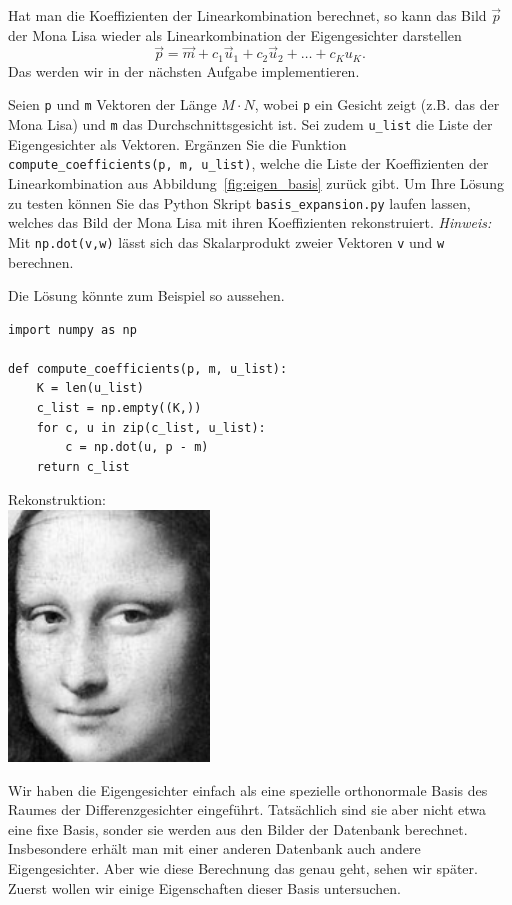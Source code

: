 Hat man die Koeffizienten der Linearkombination berechnet, so kann das Bild $\vec p$ der Mona Lisa wieder als Linearkombination der Eigengesichter darstellen
\begin{equation*}
	\vec p=\vec m+c_1\vec u_1+c_2\vec u_2+\ldots+c_Ku_K.
\end{equation*}
Das werden wir in der nächsten Aufgabe implementieren.
\begin{aufgabe} \label{aufg:compute_coefficients}
	Seien \texttt{p} und \texttt{m} Vektoren der Länge $M\cdot N$, wobei \texttt{p} ein Gesicht zeigt (z.B. das der Mona Lisa) und \texttt{m} das Durchschnittsgesicht ist.
	Sei zudem \texttt{u\_list} die Liste der Eigengesichter als Vektoren.
	Ergänzen Sie die Funktion \texttt{compute\_coefficients(p, m, u\_list)}, welche die Liste der Koeffizienten der Linearkombination aus Abbildung~\ref{fig:eigen_basis} zurück gibt.
	Um Ihre Lösung zu testen können Sie das Python Skript \texttt{basis\_expansion.py} laufen lassen, welches das Bild der Mona Lisa mit ihren Koeffizienten rekonstruiert.
	\textit{Hinweis:} Mit \texttt{np.dot(v,w)} lässt sich das Skalarprodukt zweier Vektoren \texttt{v} und \texttt{w} berechnen.
\end{aufgabe}
\begin{losung*}
	Die Lösung könnte zum Beispiel so aussehen.\\[0.5cm]
	\begin{minipage}{0.65\textwidth}
\begin{lstlisting}[style=python]
import numpy as np

def compute_coefficients(p, m, u_list):
	K = len(u_list)
	c_list = np.empty((K,))
	for c, u in zip(c_list, u_list):
		c = np.dot(u, p - m)
	return c_list
\end{lstlisting}
	\end{minipage}\hfill
	\begin{minipage}{0.35\textwidth}\vspace{-1cm}
		\centering Rekonstruktion:\\[0.5cm]
		\includegraphics[width=0.4\textwidth]{images/eigenfaces/mona_lisa_original}
	\end{minipage}
\end{losung*}
Wir haben die Eigengesichter einfach als eine spezielle orthonormale Basis des Raumes der Differenzgesichter eingeführt.
Tatsächlich sind sie aber nicht etwa eine fixe Basis, sonder sie werden aus den Bilder der Datenbank berechnet.
Insbesondere erhält man mit einer anderen Datenbank auch andere Eigengesichter.
Aber wie diese Berechnung das genau geht, sehen wir später.
Zuerst wollen wir einige Eigenschaften dieser Basis untersuchen.